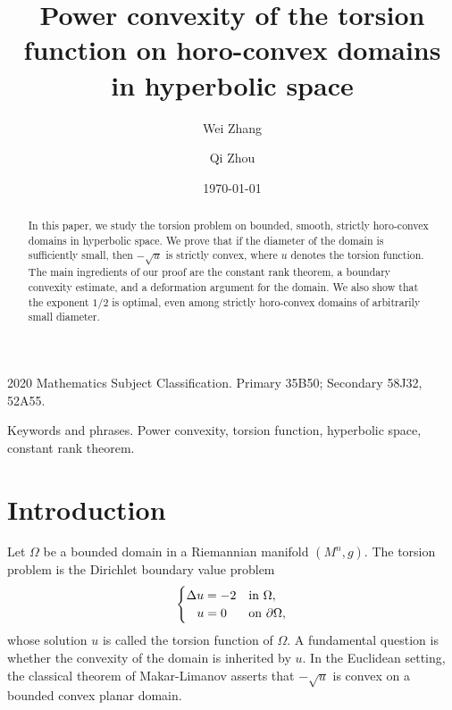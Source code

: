 \documentclass[11pt]{amsart}
\numberwithin{theorem}{section}
\numberwithin{equation}{section}
\begin{document}
\setlength{\baselineskip}{1.1\baselineskip}

\title[Power convexity of the torsion function in hyperbolic space]{Power convexity of the torsion function on horo-convex domains in hyperbolic space}

\author{Wei Zhang}
\address{School of Mathematics and Statistics\\
Lanzhou University\\
Lanzhou, 730000, Gansu Province, China.}

\author{Qi Zhou}
\address{School of Mathematics and Statistics\\
Lanzhou University\\
Lanzhou, 730000, Gansu Province, China.}


\date{\today}

\maketitle

\begin{abstract}
In this paper, we study the torsion problem on bounded, smooth, strictly horo-convex domains in hyperbolic space. We prove that if the diameter of the domain is sufficiently small, then $-\sqrt{u}$ is strictly convex, where $u$ denotes the torsion function. The main ingredients of our proof are the constant rank theorem, a boundary convexity estimate, and a deformation argument for the domain. We also show that the exponent $1/2$ is optimal, even among strictly horo-convex domains of arbitrarily small diameter.
\end{abstract}

2020 Mathematics Subject Classification. Primary 35B50; Secondary 58J32, 52A55.

Keywords and phrases. Power convexity, torsion function, hyperbolic space, constant rank theorem.

\section{Introduction}

Let $\Omega$ be a bounded domain in a Riemannian manifold $(M^n,g)$. The torsion problem is the Dirichlet boundary value problem
\begin{equation}\label{Equation-torsion problem}
\begin{cases}
\Delta u=-2 & \mathrm{in}\ \Omega,\\
\hspace{0.3cm}u=0 & \mathrm{on}\ \partial\Omega,
\end{cases}
\end{equation}
whose solution $u$ is called the torsion function of $\Omega$. A fundamental question is whether the convexity of the domain is inherited by $u$. In the Euclidean setting, the classical theorem of Makar-Limanov \cite{Makar-Limanov1971} asserts that $-\sqrt{u}$ is convex on a bounded convex planar domain.
\end{document}

